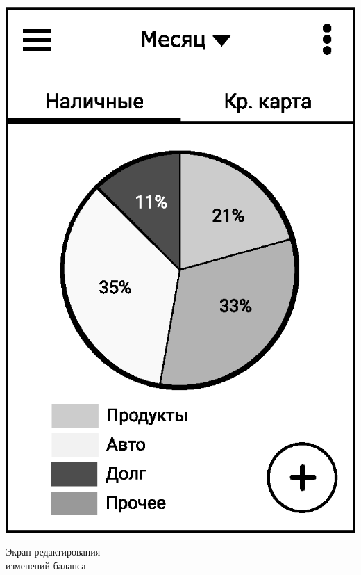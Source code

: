 \documentclass[russian,utf8,a1paper,nostitching,simple]{eskdgraph}
\begin{document}
\begin{ESKDdrawing}
\begin{minipage}{28cm}
\begin{minipage}{7.5cm}
      \vspace{2cm}
      \centering
      \includegraphics[width=\linewidth]{fig/ui_activities_balance_graphic_group.eps}
    \end{minipage}
  \end{minipage}
  \hfill
  \begin{minipage}{17cm}
    \centering
    {\fontsize{40}{50}\selectfont Экран редактирования \\ изменений баланса}

    \vspace{2cm}
    \begin{minipage}{7.5cm}
      \centering


\end{minipage}
\end{minipage}
\end{ESKDdrawing}
\end{document}
